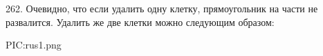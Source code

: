 262. Очевидно, что если удалить одну клетку, прямоугольник на части не развалится. Удалить же две клетки можно следующим образом:
\begin{center}
{{PIC:rus1.png}}
\end{center}
\newpage\noindent
